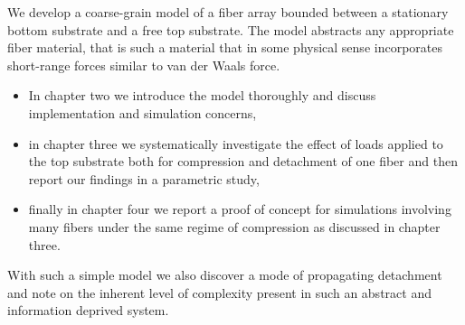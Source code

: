 	We develop a coarse-grain model of a fiber array bounded between a stationary bottom substrate and a free top substrate. The model abstracts any appropriate fiber material, that is such a material that in some physical sense incorporates short-range forces similar to van der Waals force.

\begin{itemize}
	\item {
		In chapter two we introduce the model thoroughly and discuss implementation and simulation concerns,
	}
	\item {
		in chapter three we systematically investigate the effect of loads applied to the top substrate both for compression and detachment of one fiber and then report our findings in a parametric study,
	}
	\item {
		finally in chapter four we report a proof of concept for simulations involving many fibers under the same regime of compression as discussed in chapter three.
	}
\end{itemize}

	With such a simple model we also discover a mode of propagating detachment and note on the inherent level of complexity present in such an abstract and information deprived system.		
		